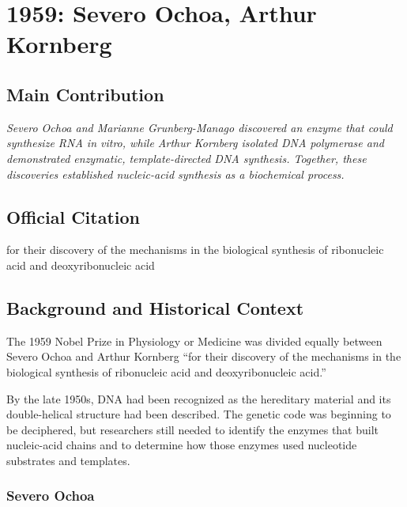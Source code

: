 \chapter[1959 --- Ochoa and Kornberg]{1959: Severo Ochoa, Arthur Kornberg}
\label{ch:1959_Ochoa}

\section*{Main Contribution}

\textit{Severo Ochoa and Marianne Grunberg-Manago discovered an enzyme that could synthesize RNA in vitro, while Arthur Kornberg isolated DNA polymerase and demonstrated enzymatic, template-directed DNA synthesis. Together, these discoveries established nucleic-acid synthesis as a biochemical process.}\cite{nobel-1959,lecture-ochoa-1959,lecture-kornberg-1959}

\section{Official Citation}

for their discovery of the mechanisms in the biological synthesis of ribonucleic acid and deoxyribonucleic acid

\section{Background and Historical Context}

The 1959 Nobel Prize in Physiology or Medicine was divided equally between Severo Ochoa and Arthur Kornberg ``for their discovery of the mechanisms in the biological synthesis of ribonucleic acid and deoxyribonucleic acid.''\cite{nobel-1959}

By the late 1950s, DNA had been recognized as the hereditary material and its double-helical structure had been described. The genetic code was beginning to be deciphered, but researchers still needed to identify the enzymes that built nucleic-acid chains and to determine how those enzymes used nucleotide substrates and templates.

\subsection{Severo Ochoa}

